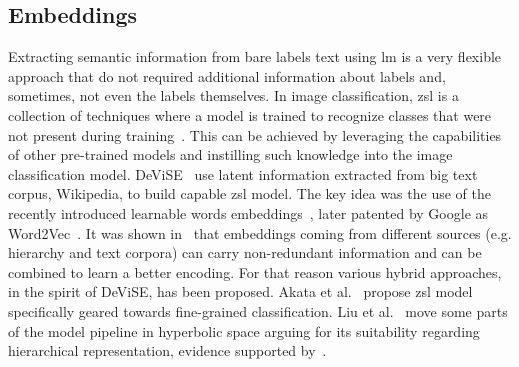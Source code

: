 \subsection{Embeddings}
\label{subsec:embeddings}


Extracting semantic information from bare labels text using \acrshort{lm} is a
very flexible approach that do not required additional information about labels
and, sometimes, not even the labels themselves. In image classification,
\acrfull{zsl} is a collection of techniques where a model is trained to
recognize classes that were not present during
training~\cite{AnIntroductionSoysal2020}. This can be achieved by leveraging
the capabilities of other pre-trained models and instilling such knowledge into
the image classification model. DeViSE~\cite{DeviseADeepFrome2013} use latent
information extracted from big text corpus, Wikipedia, to build capable
\acrshort{zsl} model. The key idea was the use of the recently introduced
learnable words embeddings~\cite{EfficientEstimMikolo2013,
DistributedRepMikolo2013}, later patented by Google as
Word2Vec~\cite{ComputingNumerMikolo2013}. It was shown
in~\cite{EvaluationOfOAkata2014, LabelEmbeddingAkata2015} that embeddings
coming from different sources (e.g. hierarchy and text corpora) can carry
non-redundant information and can be combined to learn a better encoding. For
that reason various hybrid approaches, in the spirit of DeViSE, has been
proposed. Akata et al.~\cite{EvaluationOfOAkata2014} propose \acrshort{zsl}
model specifically geared towards fine-grained classification. Liu et
al.~\cite{HyperbolicVisuLiuS2020} move some parts of the model pipeline in
hyperbolic space arguing for its suitability regarding hierarchical
representation, evidence supported by~\cite{PoincareEmbeddNickel2017,
HyperbolicEntaGanea2018}.


